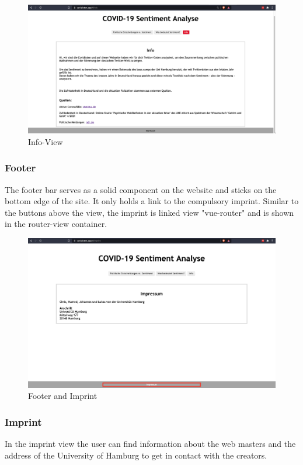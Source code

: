 \documentclass[
    fontsize=12pt,
    headings=small,
    parskip=half,           %
    bibliography=totoc,
    numbers=noenddot,       %
    open=any,               %
    ]{scrreprt}
\begin{document}
\begin{figure}
    \centering
    \includegraphics[width=1.0\textwidth]{pic/Info-Section.png}
    \caption{Info-View}
    \label{fig:my_label}
\end{figure}


\subsubsection*{Footer}
The footer bar serves as a solid component on the website and sticks on the bottom edge of the site. It only holds a link to the compulsory imprint. Similar to the buttons above the view, the imprint is linked view "vue-router" and is shown in the router-view container.

\begin{figure}[h]
    \centering
    \includegraphics[width=1.0\textwidth]{pic/Imprint.png}
    \caption{Footer and Imprint}
    \label{fig:my_label}
\end{figure}

\subsubsection*{Imprint}
In the imprint view the user can find information about the web masters and the address of the University of Hamburg to get in contact with the creators. 
\end{document}
